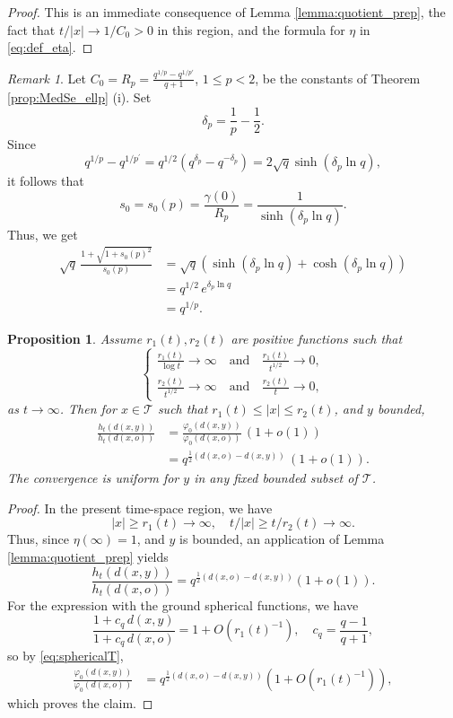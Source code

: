 \documentclass[11pt,a4paper,reqno]{amsart}
\renewcommand\mathcal{\mathscr}
\theoremstyle{plain}
\newtheorem{proposition}[theorem]{Proposition}
\theoremstyle{remark}
\newtheorem{remark}[theorem]{Remark}
\theoremstyle{definition}
\theoremstyle{remark}
\numberwithin{equation}{section}
\begin{document}
	\begin{proof}
    This is an immediate consequence of Lemma \ref{lemma:quotient_prep}, the fact that $t/|x|\to 1/C_0>0$ in this region, and the formula for $\eta$ in \eqref{eq:def_eta}.
	\end{proof}
	
	\begin{remark}\label{remark:q^{1/p}} Let $C_0=R_p=\frac{q^{1/p}-q^{1/p'}}{q+1}$, $1\leq p< 2$, be the constants of Theorem \ref{prop:MedSe_ellp} (i). Set
    $$
		\delta_p=\frac{1}{p}-\frac{1}{2}.
		$$
    Since $$q^{1 / p}-q^{1 / p^{\prime}}=q^{1 / 2}\left(q^{\delta_p}-q^{-\delta_p}\right) =2 \sqrt{q} \sinh (\delta_p \ln q),$$
   it follows that 
   \[
    s_0=s_0(p)=\frac{\gamma(0)}{R_p}= \frac{1}{\sinh (\delta_p\ln q)}.  \]
		Thus, we get
		\begin{align*}
			\sqrt{q}\, \frac{1+\sqrt{1+s_0(p)^2}}{s_0(p)}&=\sqrt{q}(\sinh (\delta_p \ln q)+\cosh (\delta_p \ln q))\\
			&=q^{1/2}\, e^{\delta_p \ln q}\\
			&=q^{1/p}.
		\end{align*}
	\end{remark}

    
	\begin{proposition}\label{prop:ratio_asym_L2}
		Assume $r_1(t), r_2(t)$ are positive functions such that \[
        \begin{cases}
        \frac{r_1(t)}{\log t}\to \infty \quad \text{and} \, &\frac{r_1(t)}{t^{1 / 2}} \to 0, \\
        \frac{r_2(t)}{t^{1/2}} \to \infty \quad \text{and} \, &\frac{r_2(t)}{t}\to 0,
        \end{cases}
        \]
        as $t \to\infty$. 
        Then for $x\in \mathcal{T}$ such that $r_1(t)\leq|x|\leq r_2(t)$, and $y$ bounded,
		\begin{align*}
			\frac{h_t(d(x,y))}{h_t(d(x,o))}&= \frac{\varphi_0(d(x,y))}{\varphi_0(d(x,o))}\, (1+o(1))\\
			&=q^{\frac{1}{2}(d(x,o)-d(x,y))}\, (1+o(1)).	
            \end{align*}
		The convergence is uniform for $y$ in any fixed bounded subset of $\mathcal T$.
	\end{proposition}
    
	\begin{proof}
    In the present time-space region, we have $$|x|\geq r_1(t)\to \infty, \quad  t/|x|\geq t/r_2(t)\to \infty.$$ Thus, since $\eta(\infty)=1$, and $y$ is bounded, an application of Lemma \ref{lemma:quotient_prep} yields
    \[
    \frac{h_t(d(x,y))}{h_t(d(x,o))}=q^{\frac{1}{2}(d(x,o)-d(x,y))}(1+o(1)).
    \]
		For the expression with the ground spherical functions, we have
		\[
		\frac{1+c_q\,d(x,y)}{1+c_q\,d(x,o)}= 1+O(r_1(t)^{-1}), \quad c_q=\frac{q-1}{q+1},
		\]
		so by \eqref{eq:sphericalT},
	        \begin{align*}
			\frac{\varphi_0(d(x,y))}{\varphi_0(d(x,o))}
			&= q^{\frac{1}{2}(d(x,o)-d(x,y))}(1+O(r_1(t)^{-1})),
            \end{align*}
	which proves the claim.
	\end{proof}
	
\end{document}
